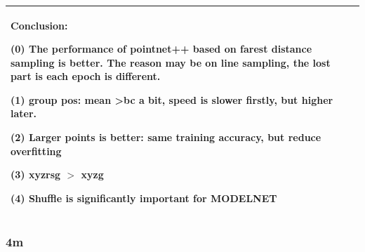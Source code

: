 \documentclass{article}
\begin{document}
\begin{tabular}{|p{1.5cm}|p{1.5cm}|p{1cm}|p{1.5cm}|p{1.5cm}|p{1.5cm}|p{5cm}| }
	\multicolumn{7}{|p{16cm}|}{ Conclusion:\par	
		(0) The performance of pointnet++ based on farest distance sampling is better. The reason may be on line sampling, the lost part is each epoch is different.\par 
		(1) group pos: mean \textgreater bc a bit, speed is slower firstly, but higher later.\par
		(2) Larger points is better: same training accuracy, but reduce overfitting\par 
		(3) xyzrsg $>$ xyzg\par 
		(4) Shuffle is significantly important for MODELNET } \\
	\hline	
\end{tabular}

\subsubsection{4m}
\end{document}

